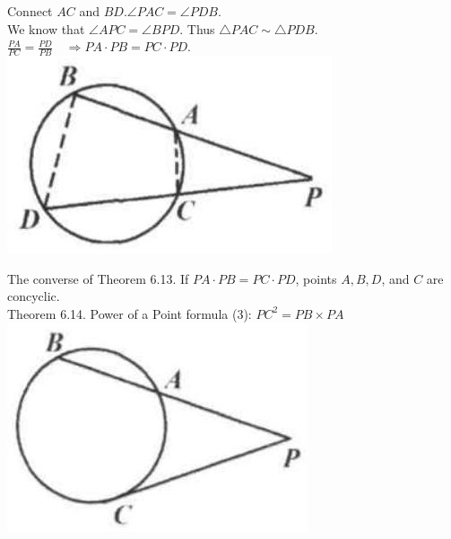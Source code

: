 \documentclass{article}
\begin{document}
Connect \(A C\) and \(B D . \angle P A C=\angle P D B\).\\
We know that \(\angle A P C=\angle B P D\). Thus \(\triangle P A C \sim \triangle P D B\).\\
\(\frac{P A}{P C}=\frac{P D}{P B} \quad \Rightarrow P A \cdot P B=P C \cdot P D\).\\
\centering
\includegraphics[width=\textwidth]{images/192(2).jpg}

The converse of Theorem 6.13.
If \(P A \cdot P B=P C \cdot P D\), points \(A, B, D\), and \(C\) are concyclic.\\
Theorem 6.14. Power of a Point formula (3): \(P C^{2}=P B \times P A\)\\
\centering
\includegraphics[width=\textwidth]{images/192(4).jpg}
\end{document}
